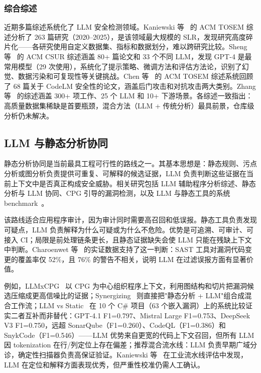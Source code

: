 \documentclass[11pt,a4paper,onecolumn]{article}
\begin{document}
\subsubsection{综合综述}
近期多篇综述系统化了 LLM 安全检测领域。Kaniewski 等~\cite{kaniewski2026detecting} 的 ACM TOSEM 综述分析了 263 篇研究（2020--2025），是该领域最大规模的 SLR，发现研究高度碎片化——各研究使用自定义数据集、指标和数据划分，难以跨研究比较。Sheng 等~\cite{sheng2026llmsecurity} 的 ACM CSUR 综述涵盖 80+ 篇论文和 33 个不同 LLM，发现 GPT-4 是最常用模型（29 次使用），系统化了提示策略、微调方法和评估方法论，识别了幻觉、数据污染和可复现性等关键挑战。Chen 等~\cite{chen2026lmcode} 的 ACM TOSEM 综述系统回顾了 68 篇关于 CodeLM 安全性的论文，涵盖后门攻击和对抗攻击两大类别。Zhang 等~\cite{sheng2025cybersecurity_slr} 的综述涵盖 300+ 项工作、25 个 LLM 和 10+ 下游场景。各综述一致指出：高质量数据集稀缺是首要瓶颈，混合方法（LLM + 传统分析）最具前景，仓库级分析仍未解决。

\subsection{LLM 与静态分析协同}
静态分析协同是当前最具工程可行性的路线之一。其基本思想是：静态规则、污点分析或图分析负责提供可重复、可解释的候选证据，LLM 负责判断这些证据在当前上下文中是否真正构成安全威胁。相关研究包括 LLM 辅助程序分析综述、静态分析与 LLM 协同、CPG 引导的漏洞检测，以及 LLM 与静态工具的系统 benchmark~\cite{program_analysis_survey_2025,synergizing_static_llm_2025,llmxcpg_2025,llm_vs_static_2025}。

该路线适合应用程序审计，因为审计同时需要高召回和低误报。静态工具负责发现可疑点，LLM 负责解释为什么可疑或为什么不危险。优势是可追溯、可审计、可接入 CI；局限是前处理链条更长，且静态证据缺失会使 LLM 只能在残缺上下文中判断。Charoenwet 等~\cite{charoenwet_2024_sast_secure_review} 的实证数据支持了这一判断：SAST 工具对漏洞代码变更的覆盖率仅 52\%，且 76\% 的警告不相关，说明 LLM 在过滤误报方面有显著价值。

例如，LLMxCPG~\cite{llmxcpg_2025} 以 CPG 为中心组织程序上下文，利用图结构和切片把漏洞候选压缩成更高信噪比的证据；Synergizing~\cite{synergizing_static_llm_2025} 则直接把"静态分析 + LLM"组合成混合工作流；LLM vs Static~\cite{llm_vs_static_2025} 在 10 个 C\# 项目（63 个嵌入漏洞）上的系统比较证实二者互补而非替代：GPT-4.1 F1=0.797、Mistral Large F1=0.753、DeepSeek V3 F1=0.750，远超 SonarQube（F1=0.260）、CodeQL（F1=0.386）和 SnykCode（F1=0.546）——LLM 优势来自更宽的代码上下文召回，但所有 LLM 因 tokenization 在行/列定位上存在偏差；推荐混合流水线：LLM 负责早期广域分诊，确定性扫描器负责高保证验证。Kaniewski 等~\cite{kaniewski2026detecting} 在工业流水线评估中发现，LLM 在定位和解释方面表现优秀，但严重性校准仍需人工确认。
\end{document}
